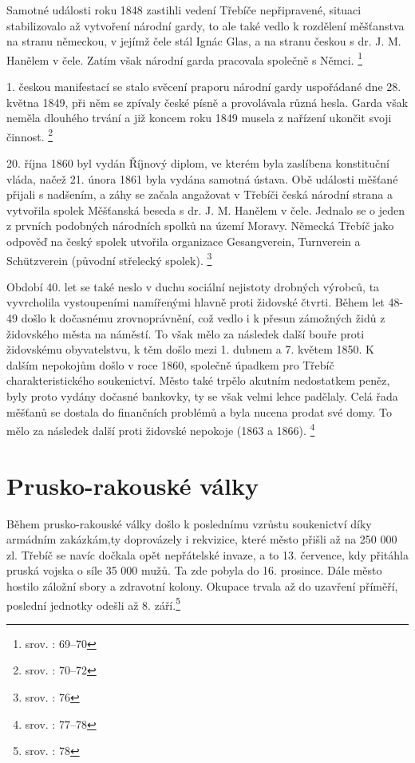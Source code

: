 \documentclass[a4paper,oneside,12p]{report}
\begin{document}
Samotné události roku 1848 zastihli vedení Třebíče nepřipravené, situaci stabilizovalo až vytvoření národní gardy, to ale také vedlo k rozdělení měšťanstva na stranu německou, v jejímž čele stál Ignác Glas, a na stranu českou s dr. J. M. Hanělem v čele.
Zatím však národní garda pracovala společně s Němci. \footnote{srov. \cite{Janak1981}: 69--70}

1. českou manifestací se stalo svěcení praporu národní gardy uspořádané dne 28. května 1849, při něm se zpívaly české písně a provolávala různá hesla.
Garda však neměla dlouhého trvání a již koncem roku 1849 musela z nařízení ukončit svoji činnost. \footnote{srov. \cite{Janak1981}: 70--72}

20. října 1860 byl vydán Říjnový diplom, ve kterém byla zaslíbena konstituční vláda, načež 21. února 1861 byla vydána samotná ústava.
Obě události měšťané přijali s nadšením, a záhy se začala angažovat v Třebíči česká národní strana a vytvořila spolek Měšťanská beseda s dr. J. M. Hanělem v čele.
Jednalo se o jeden z prvních podobných národních spolků na území Moravy.
Německá Třebíč jako odpověď na český spolek utvořila organizace Gesangverein, Turnverein a Schützverein (původní střelecký spolek). \footnote{srov. \cite{Janak1981}: 76}

Období 40. let se také neslo v duchu sociální nejistoty drobných výrobců, ta vyvrcholila vystoupeními namířenými hlavně proti židovské čtvrti.
Během let 48-49 došlo k dočasnému zrovnoprávnění, což vedlo i k přesun zámožných židů z židovského města na náměstí.
To však mělo za následek další bouře proti židovskému obyvatelstvu, k těm došlo mezi 1. dubnem a 7. květem 1850.
K dalším nepokojům došlo v roce 1860, společně úpadkem pro Třebíč charakteristického soukenictví.
Město také trpělo akutním nedostatkem peněz, byly proto vydány dočasné bankovky, ty se však velmi lehce padělaly.
Celá řada měšťanů se dostala do finančních problémů a byla nucena prodat své domy.
To mělo za následek další proti židovské nepokoje (1863 a 1866). \footnote{srov. \cite{Janak1981}: 77--78}

\section{Prusko-rakouské války}

Během prusko-rakouské války došlo k poslednímu vzrůstu soukenictví díky armádním zakázkám,ty doprovázely i rekvizice, které město přišli až na 250 000 zl.
Třebíč se navíc dočkala opět nepřátelské invaze, a to 13. července, kdy přitáhla pruská vojska o síle 35 000 mužů.
Ta zde pobyla do 16. prosince.
Dále město hostilo záložní sbory a zdravotní kolony.
Okupace trvala až do uzavření příměří, poslední jednotky odešli až 8. září.\footnote{srov. \cite{Janak1981}: 78}
\end{document}

